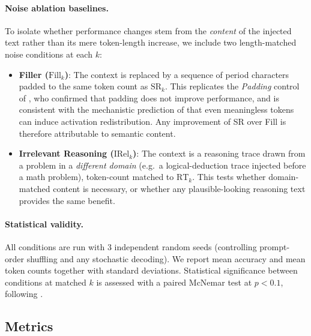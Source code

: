 \paragraph{Noise ablation baselines.}
To isolate whether performance changes stem from the \emph{content} of the injected
text rather than its mere token-length increase, we include two length-matched noise
conditions at each $k$:

\begin{itemize}
  \item \textbf{Filler ($\mathrm{Fill}_k$)}: The context is replaced by a sequence
        of period characters padded to the same token count as $\mathrm{SR}_k$.
        This replicates the \emph{Padding} control of \citet{leviathan2025prompt},
        who confirmed that padding does not improve performance, and is consistent
        with the mechanistic prediction of \citet{shi2025meaningless} that even
        meaningless tokens can induce activation redistribution.
        Any improvement of SR over Fill is therefore attributable to semantic content.
  \item \textbf{Irrelevant Reasoning ($\mathrm{IRel}_k$)}: The context is a
        reasoning trace drawn from a problem in a \emph{different domain}
        (e.g.\ a logical-deduction trace injected before a math problem),
        token-count matched to $\mathrm{RT}_k$.
        This tests whether domain-matched content is necessary, or whether any
        plausible-looking reasoning text provides the same benefit.
\end{itemize}

\paragraph{Statistical validity.}
All conditions are run with 3 independent random seeds (controlling prompt-order
shuffling and any stochastic decoding). We report mean accuracy and mean token counts
together with standard deviations. Statistical significance between conditions at
matched $k$ is assessed with a paired McNemar test \cite{mcnemar1947} at
$p < 0.1$, following \citet{leviathan2025prompt}.

\subsection{Metrics}
\label{subsec:metrics}

